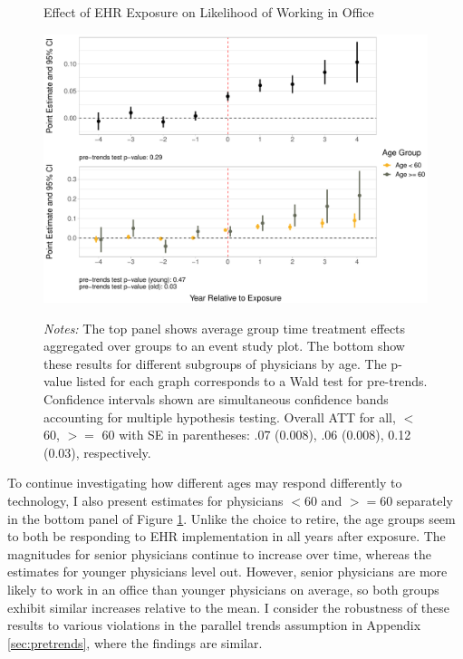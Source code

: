 \documentclass[12pt]{article}
\begin{document}
\begin{figure}[ht]
    \centering
    \captionsetup{width=.85\linewidth}
    \caption{Effect of EHR Exposure on Likelihood of Working in Office}
    \includegraphics[scale=.6]{Objects/officeind_plot.pdf}
    \label{fig:officefirst}
    \vspace{2mm}
    \caption*{\footnotesize{\textit{Notes:} The top panel shows average group time treatment effects aggregated over groups to an event study plot. The bottom show these results for different subgroups of physicians by age. The p-value listed for each graph corresponds to a Wald test for pre-trends. Confidence intervals shown are simultaneous confidence bands accounting for multiple hypothesis testing. Overall ATT for all, $<$ 60, $>=$ 60 with SE in parentheses: .07 (0.008), .06 (0.008), 0.12 (0.03), respectively.}}
\end{figure}

To continue investigating how different ages may respond differently to technology, I also present estimates for physicians $<60$ and $>=60$ separately in the bottom panel of Figure \ref{fig:officefirst}. Unlike the choice to retire, the age groups seem to both be responding to EHR implementation in all years after exposure. The magnitudes for senior physicians continue to increase over time, whereas the estimates for younger physicians level out. However, senior physicians are more likely to work in an office than younger physicians on average, so both groups exhibit similar increases relative to the mean. I consider the robustness of these results to various violations in the parallel trends assumption in Appendix \ref{sec:pretrends}, where the findings are similar.
\end{document}
